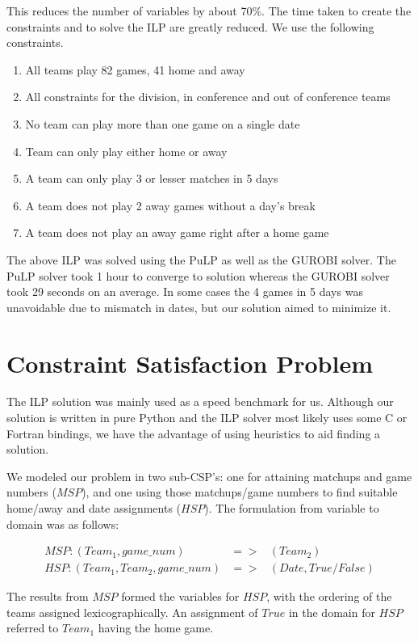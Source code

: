\documentclass{article}
\begin{document}
	This reduces the number of variables by about 70\%. The time taken to create the constraints and to solve the ILP are greatly reduced. We use the following constraints.
	\begin{enumerate}
		\item All teams play 82 games, 41 home and away
		\item All constraints for the division, in conference and out of conference teams
		\item No team can play more than one game on a single date
		\item Team can only play either home or away
		\item A team can only play 3 or lesser matches in 5 days
		\item A team does not play 2 away games without a day's break
		\item A team does not play an away game right after a home game
	\end{enumerate}
	The above ILP was solved using the PuLP as well as the GUROBI solver. The PuLP solver took 1 hour to converge to solution whereas the GUROBI solver took 29 seconds on an average. In some cases the 4 games in 5 days was unavoidable due to mismatch in dates, but our solution aimed to minimize it.

	\section{Constraint Satisfaction Problem}
	The ILP solution was mainly used as a speed benchmark for us. Although our solution is written in pure Python and the ILP solver most likely uses some C or Fortran bindings, we have the advantage of using heuristics to aid finding a solution.

	We modeled our problem in two sub-CSP's: one for attaining matchups and game numbers ($MSP$), and one using those matchups/game numbers to find suitable home/away and date assignments ($HSP$). The formulation from variable to domain was as follows:

	\begin{eqnarray*}
		MSP: (Team_1, game\_num) &=>& (Team_2) \\
		HSP: (Team_1, Team_2, game\_num) &=>& (Date, True/False)
	\end{eqnarray*}

	The results from $MSP$ formed the variables for $HSP$, with the ordering of the teams assigned lexicographically. An assignment of $True$ in the domain for $HSP$ referred to $Team_1$ having the home game.
\end{document}
